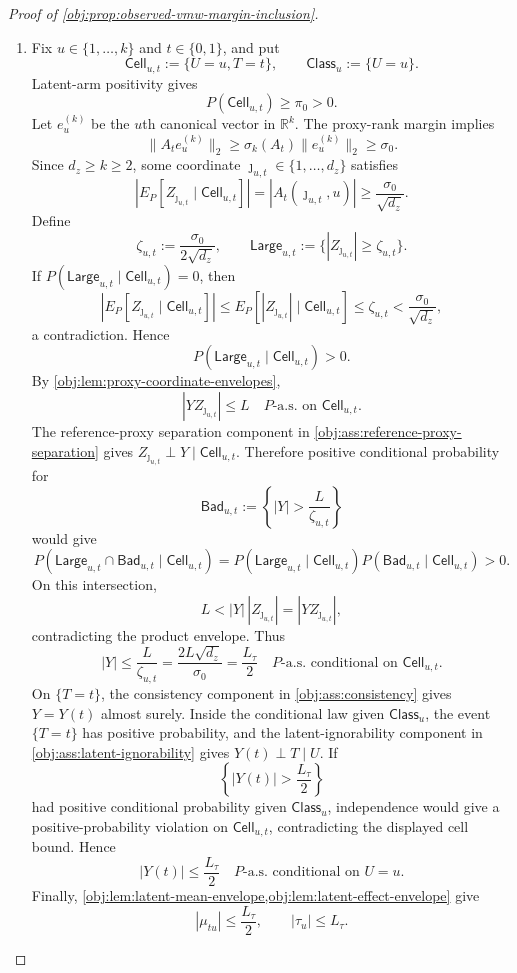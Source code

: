 \documentclass[11pt]{article}
\begin{document}
\begin{proof}[Proof of \cref{obj:prop:observed-vmw-margin-inclusion}]
\begin{enumerate}
\item Fix \(u\in\{1,\ldots,k\}\) and \(t\in\{0,1\}\), and put
\[
\mathsf{Cell}_{u,t}:=\{U=u,T=t\},
\qquad
\mathsf{Class}_u:=\{U=u\}.
\]
Latent-arm positivity gives
\[
P(\mathsf{Cell}_{u,t})\ge\pi_0>0.
\]
Let \(e_u^{(k)}\) be the \(u\)th canonical vector in \(\mathbb R^k\).  The proxy-rank margin implies
\[
\|A_te_u^{(k)}\|_2
\ge
\sigma_k(A_t)\|e_u^{(k)}\|_2
\ge
\sigma_0 .
\]
Since \(d_z\ge k\ge2\), some coordinate \(\jmath_{u,t}\in\{1,\ldots,d_z\}\) satisfies
\[
\left|E_P[Z_{\jmath_{u,t}}\mid \mathsf{Cell}_{u,t}]\right|
=
|A_t(\jmath_{u,t},u)|
\ge
\frac{\sigma_0}{\sqrt{d_z}} .
\]
Define
\[
\zeta_{u,t}:=\frac{\sigma_0}{2\sqrt{d_z}},
\qquad
\mathsf{Large}_{u,t}:=\{|Z_{\jmath_{u,t}}|\ge \zeta_{u,t}\}.
\]
If \(P(\mathsf{Large}_{u,t}\mid\mathsf{Cell}_{u,t})=0\), then
\[
\left|E_P[Z_{\jmath_{u,t}}\mid \mathsf{Cell}_{u,t}]\right|
\le
E_P[|Z_{\jmath_{u,t}}|\mid \mathsf{Cell}_{u,t}]
\le
\zeta_{u,t}
<
\frac{\sigma_0}{\sqrt{d_z}},
\]
a contradiction.  Hence
\[
P(\mathsf{Large}_{u,t}\mid\mathsf{Cell}_{u,t})>0 .
\]
By \cref{obj:lem:proxy-coordinate-envelopes},
\[
|YZ_{\jmath_{u,t}}|\le L
\quad P\text{-a.s. on }\mathsf{Cell}_{u,t}.
\]
The reference-proxy separation component in \cref{obj:ass:reference-proxy-separation} gives \(Z_{\jmath_{u,t}}\perp Y\mid \mathsf{Cell}_{u,t}\).  Therefore positive conditional probability for
\[
\mathsf{Bad}_{u,t}:=
\left\{|Y|>\frac{L}{\zeta_{u,t}}\right\}
\]
would give
\[
P(\mathsf{Large}_{u,t}\cap\mathsf{Bad}_{u,t}\mid\mathsf{Cell}_{u,t})
=
P(\mathsf{Large}_{u,t}\mid\mathsf{Cell}_{u,t})
P(\mathsf{Bad}_{u,t}\mid\mathsf{Cell}_{u,t})
>0.
\]
On this intersection,
\[
L<|Y|\,|Z_{\jmath_{u,t}}|=|YZ_{\jmath_{u,t}}|,
\]
contradicting the product envelope.  Thus
\[
|Y|
\le
\frac{L}{\zeta_{u,t}}
=
\frac{2L\sqrt{d_z}}{\sigma_0}
=
\frac{L_\tau}{2}
\quad P\text{-a.s. conditional on }\mathsf{Cell}_{u,t}.
\]
On \(\{T=t\}\), the consistency component in \cref{obj:ass:consistency} gives \(Y=Y(t)\) almost surely.  Inside the conditional law given \(\mathsf{Class}_u\), the event \(\{T=t\}\) has positive probability, and the latent-ignorability component in \cref{obj:ass:latent-ignorability} gives \(Y(t)\perp T\mid U\).  If
\[
\left\{|Y(t)|>\frac{L_\tau}{2}\right\}
\]
had positive conditional probability given \(\mathsf{Class}_u\), independence would give a positive-probability violation on \(\mathsf{Cell}_{u,t}\), contradicting the displayed cell bound.  Hence
\[
|Y(t)|\le\frac{L_\tau}{2}
\quad P\text{-a.s. conditional on }U=u .
\]
Finally, \cref{obj:lem:latent-mean-envelope,obj:lem:latent-effect-envelope} give
\[
|\mu_{tu}|\le \frac{L_\tau}{2},
\qquad
|\tau_u|\le L_\tau .
\]


\end{enumerate}
\end{proof}
\end{document}
